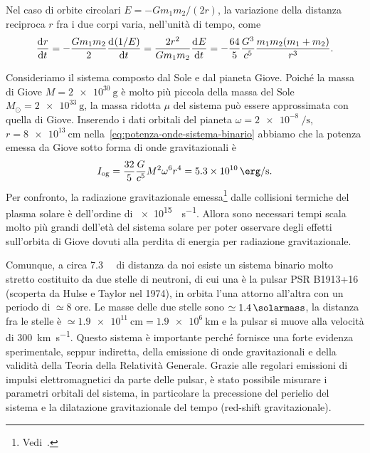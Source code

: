 Nel caso di orbite circolari $E = -Gm_{1}m_{2}/(2r)$, la variazione della
distanza reciproca $r$ fra i due corpi varia, nell'unità di tempo, come
\begin{equation}
  \frac{{\mathop{}\!\mathrm{d}^{}}r}{\mathop{}\!\mathrm{d} {t}^{}} = -\frac{Gm_{1}m_{2}}{2} \frac{{\mathop{}\!\mathrm{d}^{}}(1/E)}{\mathop{}\!\mathrm{d} {t}^{}} =
  \frac{2r^{2}}{Gm_{1}m_{2}} \frac{{\mathop{}\!\mathrm{d}^{}}E}{\mathop{}\!\mathrm{d} {t}^{}} = -\frac{64}{5}\frac{G^{3}}{c^{5}}
  \frac{m_{1}m_{2}(m_{1} + m_{2})}{r^{3}}.
\end{equation}

Consideriamo il sistema composto dal Sole e dal pianeta Giove.  Poiché la massa
di Giove $M = \SI{2e30}{\gram}$ è molto più piccola della massa del Sole
$M_{\odot} = \SI{2e33}{\gram}$, la massa ridotta $\mu$ del sistema può essere
approssimata con quella di Giove.  Inserendo i dati orbitali del pianeta
$\omega = \SI[per-mode=reciprocal]{2e-8}{\per\second}$,
$r = \SI{8e13}{\centi\metre}$ nella~\eqref{eq:potenza-onde-sistema-binario}
abbiamo che la potenza emessa da Giove sotto forma di onde gravitazionali è
\begin{equation}
  I_{\textup{og}} = \frac{32}{5} \frac{G}{c^{5}} M^{2} \omega^{6} r^{4} =
  \SI{5.3e10}{\erg\per\second}.
\end{equation}
Per confronto, la radiazione gravitazionale
emessa\footnote{Vedi~\textcite[266]{weinberg:gravitation}.}  dalle collisioni
termiche del plasma solare è dell'ordine di \SI{e15}{\erg\per\second}.  Allora
sono necessari tempi scala molto più grandi dell'età del sistema solare per
poter osservare degli effetti sull'orbita di Giove dovuti alla perdita di
energia per radiazione gravitazionale.

Comunque, a circa \SI{7.3}{\kilo\parsec} di distanza da noi esiste un sistema
binario molto stretto costituito da due stelle di neutroni, di cui una è la
pulsar PSR B1913+16 (scoperta da Hulse e Taylor nel 1974), in orbita l'una
attorno all'altra con un periodo di $\simeq 8$ ore.  Le masse delle due stelle
sono $\simeq \SI{1.4}{\solarmass}$, la distanza fra le stelle è $\simeq
\SI{1.9e11}{\centi\metre} = \SI{1.9e6}{\kilo\metre}$ e la pulsar si muove alla
velocità di \SI{300}{\kilo\metre\per\second}.  Questo sistema è importante
perché fornisce una forte evidenza sperimentale, seppur indiretta, della
emissione di onde gravitazionali e della validità della Teoria della Relatività
Generale.  Grazie alle regolari emissioni di impulsi elettromagnetici da parte
delle pulsar, è stato possibile misurare i parametri orbitali del sistema, in
particolare la precessione del perielio del sistema e la dilatazione
gravitazionale del tempo (red-shift gravitazionale).

